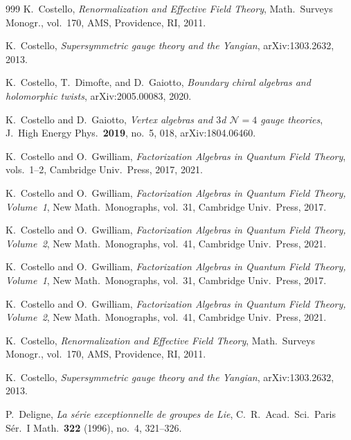\documentclass[11pt]{memoir}
\begin{document}
\begin{thebibliography}{999}
K.~Costello, \emph{Renormalization and Effective Field Theory}, Math.\ Surveys Monogr., vol.~170, AMS, Providence, RI, 2011.

K.~Costello, \emph{Supersymmetric gauge theory and the Yangian}, arXiv:1303.2632, 2013.

K.~Costello, T.~Dimofte, and D.~Gaiotto, \emph{Boundary chiral algebras and holomorphic twists}, arXiv:2005.00083, 2020.

K.~Costello and D.~Gaiotto, \emph{Vertex algebras and $3$d $\mathcal N=4$ gauge theories}, J.\ High Energy Phys.\ \textbf{2019}, no.~5, 018, arXiv:1804.06460.

K.~Costello and O.~Gwilliam, \emph{Factorization Algebras in Quantum Field Theory}, vols.~1--2, Cambridge Univ.\ Press, 2017, 2021.

K.~Costello and O.~Gwilliam, \emph{Factorization Algebras in Quantum Field Theory, Volume~1}, New Math.\ Monographs, vol.~31, Cambridge Univ.\ Press, 2017.

K.~Costello and O.~Gwilliam, \emph{Factorization Algebras in Quantum Field Theory, Volume~2}, New Math.\ Monographs, vol.~41, Cambridge Univ.\ Press, 2021.

K.~Costello and O.~Gwilliam, \emph{Factorization Algebras in Quantum Field Theory, Volume~1}, New Math.\ Monographs, vol.~31, Cambridge Univ.\ Press, 2017.

K.~Costello and O.~Gwilliam, \emph{Factorization Algebras in Quantum Field Theory, Volume~2}, New Math.\ Monographs, vol.~41, Cambridge Univ.\ Press, 2021.

K.~Costello, \emph{Renormalization and Effective Field Theory}, Math.\ Surveys Monogr., vol.~170, AMS, Providence, RI, 2011.

K.~Costello, \emph{Supersymmetric gauge theory and the Yangian}, arXiv:1303.2632, 2013.

P.~Deligne, \emph{La s\'erie exceptionnelle de groupes de Lie}, C.~R.~Acad.\ Sci.\ Paris S\'er.~I Math.\ \textbf{322} (1996), no.~4, 321--326.


\end{thebibliography}
\end{document}
